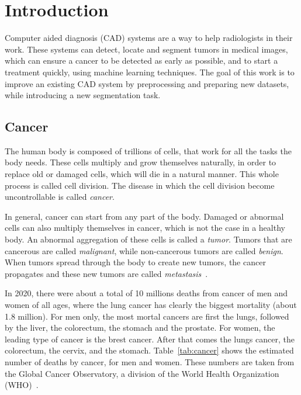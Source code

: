 
\chapter{Introduction}
\label{ch:introduction}

Computer aided diagnosis (CAD) systems are a way to help radiologists in their work. These systems can detect, locate and segment tumors in medical images, which can ensure a cancer to be detected as early as possible, and to start a treatment quickly, using machine learning techniques. The goal of this work is to improve an existing CAD system by preprocessing and preparing new datasets, while introducing a new segmentation task.


\section{Cancer}
The human body is composed of trillions of cells, that work for all the tasks the body needs. These cells multiply and grow themselves naturally, in order to replace old or damaged cells, which will die in a natural manner. This whole process is called cell division. The disease in which the cell division become uncontrollable is called \emph{cancer}.

In general, cancer can start from any part of the body. Damaged or abnormal cells can also multiply themselves in cancer, which is not the case in a healthy body. An abnormal aggregation of these cells is called a \emph{tumor}. Tumors that are cancerous are called \emph{malignant}, while non-cancerous tumors are called \emph{benign}. When tumors spread through the body to create new tumors, the cancer propagates and these new tumors are called \emph{metastasis}~\cite{national_cancer_institute_what_2007}.

In 2020, there were about a total of 10 millions deaths from cancer of men and women of all ages, where the lung cancer has clearly the biggest mortality (about 1.8 million). For men only, the most mortal cancers are first the lungs, followed by the liver, the colorectum, the stomach and the prostate. For women, the leading type of cancer is the brest cancer. After that comes the lungs cancer, the colorectum, the cervix, and the stomach. Table~\ref{tab:cancer} shows the estimated number of deaths by cancer, for men and women. These numbers are taken from the Global Cancer Observatory, a division of the World Health Organization (WHO)~\cite{global_cancer_observatory_cancer_2020}.


